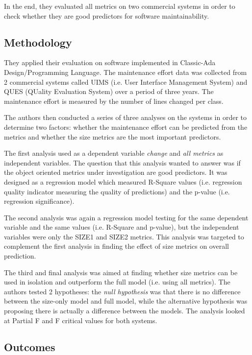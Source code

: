 \documentclass[a4paper,12pt]{article}
\begin{document}
In the end, they evaluated all metrics on two commercial systems in order to check
whether they are good predictors for software maintainability.

\subsection{Methodology}

They applied their evaluation on software implemented in Classic-Ada 
Design/Programming Language. The maintenance effort data was collected from
2 commercial systems called UIMS (i.e. User Interface Management System)
and QUES (QUality Evaluation System) over a period of three years. The 
maintenance effort is measured by the number of lines changed per class.

The authors then conducted a series of three analyses on the systems in order
to determine two factors: whether the maintenance effort can be predicted from the
metrics and whether the size metrics are the most important predictors.

The first analysis used as a dependent variable \emph{change} and \emph{all metrics}
as independent variables. The question that this analysis wanted to answer was if 
the object oriented metrics under investigation are good predictors. It was designed
as a regression model which measured R-Square values (i.e. regression quality
indicator measuring the quality of predictions) and the p-value (i.e. regression
significance).

The second analysis was again a regression model testing for the same dependent 
variable and the same values (i.e. R-Square and p-value), but the independent 
variables were only the SIZE1 and SIZE2 metrics. This analysis was targeted to 
complement the first analysis in finding the effect of size metrics on overall 
prediction.

The third and final analysis was aimed at finding whether size metrics can be used
in isolation and outperform the full model (i.e. using all metrics). The authors
tested 2 hypotheses: the \emph{null hypothesis} was that there is no difference 
between the size-only model and full model, while the alternative hypothesis was
proposing there is actually a difference between the models. The analysis looked at
Partial F and F critical values for both systems.

\subsection{Outcomes}
\end{document}
